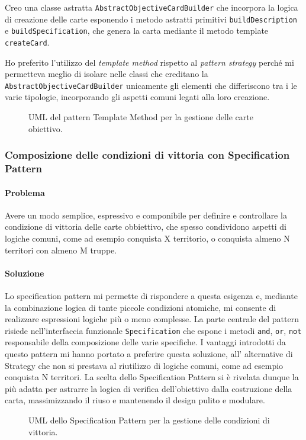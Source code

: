 \documentclass[a4paper,12pt]{report}
\begin{document}
Creo una classe astratta \texttt{AbstractObjectiveCardBuilder} che incorpora la logica di creazione delle carte esponendo i metodo astratti primitivi \texttt{buildDescription} e \texttt{buildSpecification}, che genera la carta mediante il metodo template \texttt{createCard}.

Ho preferito l'utilizzo del \textit{template method} rispetto al \textit{pattern strategy} perché mi permetteva meglio di isolare nelle classi che ereditano la \\\texttt{AbstractObjectiveCardBuilder} unicamente gli elementi che differiscono tra i le varie tipologie, incorporando gli aspetti comuni legati alla loro creazione.
\begin{figure}[H]
	\centering
	
	\caption{UML del pattern Template Method per la gestione delle carte obiettivo.}
\end{figure}
\subsubsection{Composizione delle condizioni di vittoria con Specification Pattern}
\paragraph{Problema}
Avere un modo semplice, espressivo e componibile per definire e controllare la condizione di vittoria delle carte obbiettivo, che spesso condividono aspetti di logiche comuni, come ad esempio conquista X territorio, o conquista almeno N territori con almeno M truppe.
\paragraph{Soluzione}
Lo specification pattern mi permette di rispondere a questa esigenza e, mediante la combinazione logica di tante piccole condizioni atomiche, mi consente di realizzare espressioni logiche più o meno complesse. La parte centrale del pattern risiede nell'interfaccia funzionale \texttt{Specification} che espone i metodi \texttt{and}, \texttt{or}, \texttt{not} responsabile della composizione delle varie specifiche.
I vantaggi introdotti da questo pattern mi hanno portato a preferire questa soluzione, all' alternative di Strategy che non si prestava al riutilizzo di logiche comuni, come ad esempio conquista N territori.
La scelta dello Specification Pattern si è rivelata dunque la più adatta per astrarre la logica di verifica dell'obiettivo dalla costruzione della carta, massimizzando il riuso e mantenendo il design pulito e modulare.
\begin{figure}[H]
	\centering
	
	\caption{UML dello Specification Pattern per la gestione delle condizioni di vittoria.}
\end{figure}
\end{document}
